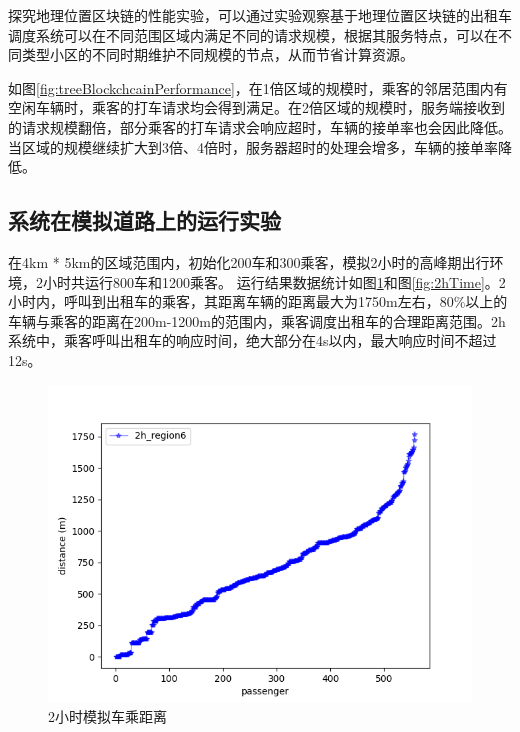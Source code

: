 探究地理位置区块链的性能实验，可以通过实验观察基于地理位置区块链的出租车调度系统可以在不同范围区域内满足不同的请求规模，根据其服务特点，可以在不同类型小区的不同时期维护不同规模的节点，从而节省计算资源。

如图\ref{fig:treeBlockchcainPerformance}，在1倍区域的规模时，乘客的邻居范围内有空闲车辆时，乘客的打车请求均会得到满足。在2倍区域的规模时，服务端接收到的请求规模翻倍，部分乘客的打车请求会响应超时，车辆的接单率也会因此降低。当区域的规模继续扩大到3倍、4倍时，服务器超时的处理会增多，车辆的接单率降低。

\subsection{系统在模拟道路上的运行实验}
在4km * 5km的区域范围内，初始化200车和300乘客，模拟2小时的高峰期出行环境，2小时共运行800车和1200乘客。
运行结果数据统计如图\ref{fig:2hDistance}和图\ref{fig:2hTime}。2小时内，呼叫到出租车的乘客，其距离车辆的距离最大为1750m左右，80$\%$以上的车辆与乘客的距离在200m-1200m的范围内，乘客调度出租车的合理距离范围。2h系统中，乘客呼叫出租车的响应时间，绝大部分在4s以内，最大响应时间不超过12s。

\begin{figure}
  \centering
  \includegraphics[width=1.0\textwidth]{figures/2hDistance}
  \caption{2小时模拟车乘距离}\label{fig:2hDistance}
\end{figure}

